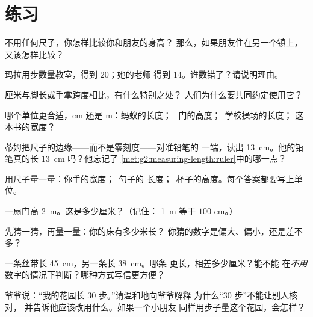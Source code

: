 \section{练习}

\begin{exercise}[$\star$]\label{exo:g2:measuring-length:1}
不用任何尺子，你怎样比较你和朋友的身高？
那么，如果朋友住在另一个镇上，又该怎样比较？
\end{exercise}

\begin{exercise}[$\star$]\label{exo:g2:measuring-length:2}
玛拉用步数量教室，得到 $20$；她的老师
得到 $14$。谁数错了？请说明理由。
\end{exercise}

\begin{exercise}[$\star$]\label{exo:g2:measuring-length:3}
厘米与脚长或手掌跨度相比，有什么特别之处？
人们为什么要共同约定使用它？
\end{exercise}

\begin{exercise}[$\star$]\label{exo:g2:measuring-length:4}
哪个单位更合适，\unit{cm} 还是 \unit{m}：蚂蚁的长度；
\ 门的高度；\ 学校操场的长度；
这本书的宽度？
\end{exercise}

\begin{exercise}[$\star$]\label{exo:g2:measuring-length:5}
蒂姆把尺子的边缘——而不是零刻度——对准铅笔的
一端，读出 \qty{13}{cm}。他的铅笔真的长
\qty{13}{cm} 吗？他忘记了
\cref{met:g2:measuring-length:ruler}中的哪一点？
\end{exercise}

\begin{exercise}[$\star$]\label{exo:g2:measuring-length:6}
用尺子量一量：你手的宽度；\ 勺子的
长度；\ 杯子的高度。每个答案都要写上单位。
\end{exercise}

\begin{exercise}[$\star$]\label{exo:g2:measuring-length:7}
一扇门高 \qty{2}{m}。这是多少厘米？（记住：
\qty{1}{m} 等于 $100$ \unit{cm}。）
\end{exercise}

\begin{exercise}[$\star$]\label{exo:g2:measuring-length:8}
先猜一猜，再量一量：你的床有多少米长？
你猜的数字是偏大、偏小，还是差不多？
\end{exercise}

\begin{exercise}[$\star\star$]\label{exo:g2:measuring-length:9}
一条丝带长 \qty{45}{cm}，另一条长 \qty{38}{cm}。哪条
更长，相差多少厘米？能不能
在\emph{不用}数字的情况下判断？哪种方式写信更方便？
\end{exercise}

\begin{exercise}[$\star\star$]\label{exo:g2:measuring-length:10}
爷爷说：“我的花园长 $30$ 步。”请温和地向爷爷解释
为什么“$30$ 步”不能让别人核对，
并告诉他应该改用什么。如果一个小朋友
同样用步子量这个花园，会怎样？
\end{exercise}
